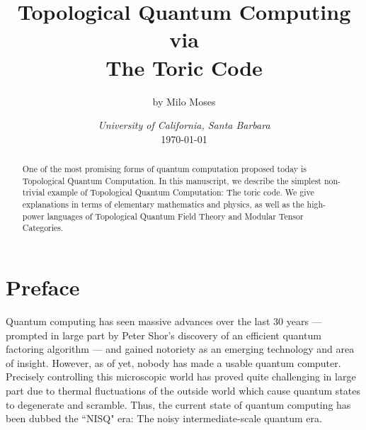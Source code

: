 \documentclass{article}
\title{Topological Quantum Computing\\ via \\ The Toric Code}
\author{by Milo Moses}
\date{\textit{University of California, Santa Barbara} \\ [2ex] \today}
\theoremstyle{definition}
\numberwithin{figure}{section}
\begin{document}
\maketitle

\newcommand{\RR}{\mathbb{R}}
\newcommand{\HH}{\mathbb{H}}
\newcommand{\NN}{\mathbb{N}}
\newcommand{\QQ}{\mathbb{Q}}
\newcommand{\CC}{\mathbb{C}}
\newcommand{\FF}{\mathbb{F}}
\newcommand{\ZZ}{\mathbb{Z}}
\newcommand{\Zcal}{\mathcal{Z}}
\newcommand{\Ncal}{\mathcal{N}}
\newcommand{\LL}{\mathscr{L}}
\newcommand{\TT}{\mathcal{T}}
\newcommand{\Ccat}{\mathscr{C}}
\newcommand{\Dcat}{\mathscr{D}}
\newcommand{\st}{\,\,\mathrm{s.t}\,\,}
\newcommand{\mm}{\mathfrak{m}}
\newcommand{\pp}{\mathfrak{p}}
\newcommand{\Hom}{\mathrm{Hom}}
\newcommand{\Aut}{\mathrm{Aut}}
\newcommand{\Frac}{\mathrm{Frac}}
\newcommand{\tr}{\mathrm{tr}}
\newcommand{\res}{\mathrm{res}}
\newcommand{\im}{\mathrm{im}}
\newcommand{\ev}{\mathrm{ev}}
\newcommand{\coev}{\mathrm{coev}}
\newcommand{\id}{\mathrm{id}}
\newcommand{\coker}{\mathrm{coker}}
\newcommand{\SL}{\mathrm{SL}}
\newcommand{\End}{\mathrm{End}}
\newcommand{\Rep}{\bold{Rep}}
\newcommand{\Set}{\bold{Set}}
\newcommand{\Vecc}{\bold{Vec}}
\newcommand{\0}{\left|0\right>}
\newcommand{\1}{\left|1\right>}
\newcommand{\nullclass}{\left|\bold{0}\right>}
\newcommand{\alphaclass}{\left|\alpha\right>}
\newcommand{\betaclass}{\left|\beta\right>}
\newcommand{\alphabetaclass}{\left|\alpha\beta\right>}
\newcommand{\ppsi}{\left|\psi\right>}
\newcommand{\bigleadsto}{\mathlarger{\mathlarger{\mathlarger{\leadsto}}}}
\newcommand{\vin}{\rotatebox[origin=c]{-90}{$\in$}}


\begin{abstract}
One of the most promising forms of quantum computation proposed today is Topological Quantum Computation. In this manuscript, we describe the simplest non-trivial example of Topological Quantum Computation: The toric code. We give explanations in terms of elementary mathematics and physics, as well as the high-power languages of Topological Quantum Field Theory and Modular Tensor Categories.
\end{abstract}

\newpage

\tableofcontents

\newpage

\section{Preface}
\label{Preface}

Quantum computing has seen massive advances over the last 30 years — prompted in large part by Peter Shor's discovery of an efficient quantum factoring algorithm \cite{shor1994algorithms} — and gained notoriety as an emerging technology and area of insight. However, as of yet, nobody has made a usable quantum computer. Precisely controlling this microscopic world has proved quite challenging in large part due to thermal fluctuations of the outside world which cause quantum states to degenerate and scramble. Thus, the current state of quantum computing has been dubbed the ``NISQ" era: The noisy intermediate-scale quantum era.
\end{document}
